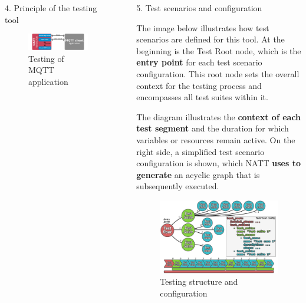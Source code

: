 \documentclass[final]{beamer}
\newlength{\sepwidth}
\newlength{\colwidth}
\newcommand{\separatorcolumn}{\begin{column}{\sepwidth}\end{column}}
\begin{document}
\begin{frame}[t]
\begin{columns}[t]
\begin{column}{\colwidth}
\begin{block}{4. Principle of the testing tool}
    \begin{figure}
      \centering
        \includegraphics[width=1.0\textwidth]{./imgs/simple-mqtt-diagram.png}
      \caption{Testing of MQTT application}
    \end{figure}

  \end{block}

\end{column}

\separatorcolumn

\begin{column}{\colwidth}

  \begin{block}{5. Test scenarios and configuration}

    The image below illustrates how test scenarios are defined for this tool. At the 
    beginning is the Test Root node, which is the \textbf{entry point} for each test 
    scenario configuration. This root node sets the overall context for the testing 
    process and encompasses all test suites within it. 

    \hspace{2em} The diagram illustrates the \textbf{context of each test segment} and the 
    duration for which variables or resources remain active. On the right side, a simplified
    test scenario configuration is shown, which NATT \textbf{uses to generate} an acyclic graph that 
    is subsequently executed.

    \begin{figure}
      \centering
        \includegraphics[width=1.0\textwidth]{./imgs/test-config-struct.png}
      \caption{Testing structure and configuration}
    \end{figure}


\end{block}
\end{column}
\end{columns}
\end{frame}
\end{document}
